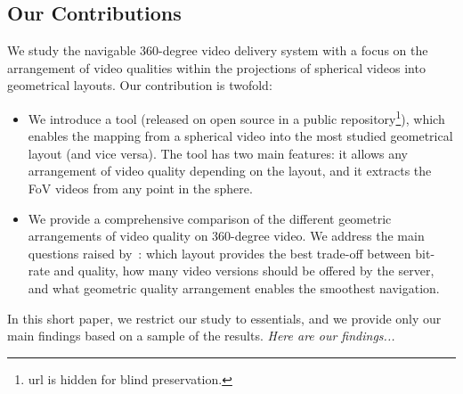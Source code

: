 \subsection{Our Contributions}

%
We study the navigable 360-degree video delivery system with a 
focus on the arrangement of video qualities within the projections of 
spherical videos into geometrical layouts. Our contribution is twofold:
\begin{itemize}
\item We introduce a tool (released on open source in a public 
repository\footnote{url is hidden for blind
preservation.}), which enables the mapping from a spherical video
into the most studied  geometrical layout (and vice versa). The tool has two main 
features: it allows
any arrangement of video quality depending on the layout, and it 
extracts the 
\ac{FoV} videos from any point in the sphere. 
\item We provide a comprehensive comparison of the different geometric arrangements of
video quality on 360-degree video. We address the main questions raised 
by~\citet{facebook}: which layout provides the best trade-off 
between bit-rate and
quality, how many video versions should be offered by the server, and what geometric 
quality arrangement 
enables the smoothest navigation.
\end{itemize}

In this short paper, we restrict our study to essentials, and we provide only our main findings based on a 
sample of the results. \textit{Here are our findings...}





